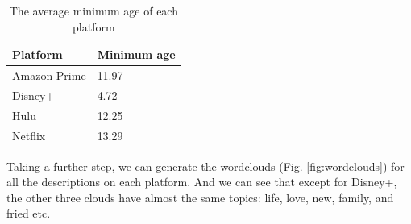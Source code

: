\documentclass{article}
\begin{document}
\begin{table}[!htb]
	\centering
	\caption{The average minimum age of each platform}
	\label{tab:platform_minimum_age}
	\begin{tabular}{@{}ll@{}}
	\toprule
	Platform     & Minimum age \\ \midrule
	Amazon Prime & 11.97       \\
	Disney+      & 4.72        \\
	Hulu         & 12.25       \\
	Netflix      & 13.29       \\ \bottomrule
	\end{tabular}
\end{table}

Taking a further step, we can generate the wordclouds (Fig. \ref{fig:wordclouds}) 
for all the descriptions on each platform. And we can see that except for Disney+, 
the other three clouds have almost the same topics: life, love, new, family, and 
fried etc.
\end{document}
